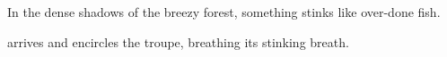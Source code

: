 \begin{boxtext}
  In the dense shadows of the breezy forest, something stinks like over-done fish.
\end{boxtext}

 arrives and encircles the troupe, breathing its stinking breath.

\basilisk
